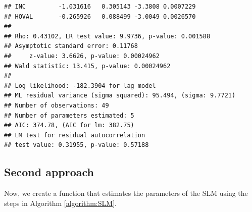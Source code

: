 \begin{knitrout}
\begin{kframe}
\begin{verbatim}
## INC         -1.031616   0.305143 -3.3808 0.0007229
## HOVAL       -0.265926   0.088499 -3.0049 0.0026570
## 
## Rho: 0.43102, LR test value: 9.9736, p-value: 0.001588
## Asymptotic standard error: 0.11768
##     z-value: 3.6626, p-value: 0.00024962
## Wald statistic: 13.415, p-value: 0.00024962
## 
## Log likelihood: -182.3904 for lag model
## ML residual variance (sigma squared): 95.494, (sigma: 9.7721)
## Number of observations: 49 
## Number of parameters estimated: 5 
## AIC: 374.78, (AIC for lm: 382.75)
## LM test for residual autocorrelation
## test value: 0.31955, p-value: 0.57188
\end{verbatim}
\end{kframe}
\end{knitrout}

\subsection{Second approach}\label{sec:code-condentrated-slm}

Now, we create a function that estimates the parameters of the SLM using the steps in  Algorithm \eqref{algorithm:SLM}.

\begin{knitrout}
\color{fgcolor}\begin{kframe}
\begin{alltt}
 \hlkwb{<-} \hlstd{(}\hlstd{,} \hlstd{,} \hlstd{,} \hlstd{,} \hlstd{)}
\hlstd{\{}

      \hlkwb{<-}  \hlstd{(} \hlstd{(}\hlstd{(} \hlopt{-}  \hlopt{*}   \hlstd{(} \hlopt{-}  \hlopt{*} 
   \hlkwb{<-}  \hlopt{-}  \hlopt{*} 
   \hlkwb{<-}  \hlopt{/} 

      \hlkwb{<-} \hlopt{-}  \hlopt{/} \hlstd{)} \hlopt{-}  \hlopt{/} \hlstd{)} \hlopt{*} \hlstd{(} \hlopt{*}  \hlopt{-}  \hlopt{/} \hlstd{)} \hlopt{*}  \hlopt{+} 
\hlstd{\}}
\end{alltt}
\end{kframe}
\end{knitrout}

